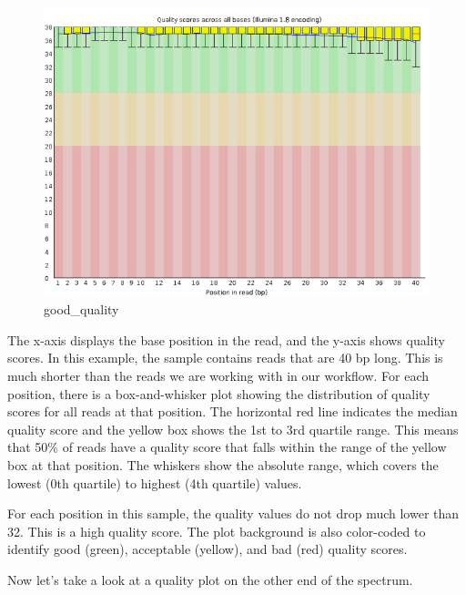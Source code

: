 \documentclass[
  letterpaper,
  DIV=11,
  numbers=noendperiod]{scrreprt}
\begin{document}
\begin{figure}

{\centering \includegraphics{images/fastqc-good.png}

}

\caption{good\_quality}

\end{figure}

The x-axis displays the base position in the read, and the y-axis shows
quality scores. In this example, the sample contains reads that are 40
bp long. This is much shorter than the reads we are working with in our
workflow. For each position, there is a box-and-whisker plot showing the
distribution of quality scores for all reads at that position. The
horizontal red line indicates the median quality score and the yellow
box shows the 1st to 3rd quartile range. This means that 50\% of reads
have a quality score that falls within the range of the yellow box at
that position. The whiskers show the absolute range, which covers the
lowest (0th quartile) to highest (4th quartile) values.

For each position in this sample, the quality values do not drop much
lower than 32. This is a high quality score. The plot background is also
color-coded to identify good (green), acceptable (yellow), and bad (red)
quality scores.

Now let's take a look at a quality plot on the other end of the
spectrum.
\end{document}
